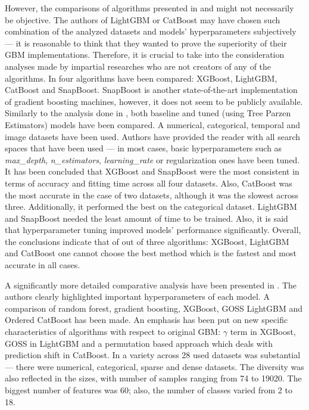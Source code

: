 \documentclass[magisterska, english]{pwr_wmat_praca_dyplomowa}
\theoremstyle{plain}
\numberwithin{theorem}{chapter}
\theoremstyle{definition}
\numberwithin{theorem}{chapter}
\begin{document}
However, the comparisons of algorithms presented in \cite{lightgbm} and \cite{catboost} might not necessarily be objective. The authors of LightGBM or CatBoost may have chosen such combination of the analyzed datasets and models' hyperparameters subjectively --- it is reasonable to think that they wanted to prove the superiority of their GBM implementations. Therefore, it is crucial to take into the consideration analyses made by impartial researches who are not creators of any of the algorithms. In \cite{competitive_analysis} four algorithms have been compared: XGBoost, LightGBM, CatBoost and SnapBoost. SnapBoost is another state-of-the-art implementation of gradient boosting machines, however, it does not seem to be publicly available. Similarly to the analysis done in \cite{catboost}, both baseline and tuned (using Tree Parzen Estimators) models have been compared. A numerical, categorical, temporal and image datasets have been used. Authors have provided the reader with all search spaces that have been used --- in most cases, basic hyperparameters such as \emph{max\_depth}, \emph{n\_estimators}, \emph{learning\_rate} or regularization ones have been tuned. It has been concluded that XGBoost and SnapBoost were the most consistent in terms of accuracy and fitting time across all four datasets. Also, CatBoost was the most accurate in the case of two datasets, although it was the slowest across three. Additionally, it performed the best on the categorical dataset. LightGBM and SnapBoost needed the least amount of time to be trained. Also, it is said that hyperparameter tuning improved models' performance significantly. Overall, the conclusions indicate that of out of three algorithms: XGBoost, LightGBM and CatBoost one cannot choose the best method which is the fastest and most accurate in all cases.

A significantly more detailed comparative analysis have been presented in \cite{comparative_analysis}. The authors clearly highlighted important hyperparameters of each model. A comparison of random forest, gradient boosting, XGBoost, GOSS LightGBM and Ordered CatBoost has been made. An emphasis has been put on new specific characteristics of algorithms with respect to original GBM: $\gamma$ term in XGBoost, GOSS in LightGBM and a permutation based approach which deals with prediction shift in CatBoost. In \cite{comparative_analysis} a variety across 28 used datasets was substantial --- there were numerical, categorical, sparse and dense datasets. The diversity was also reflected in the sizes, with number of samples ranging from 74 to 19020. The biggest number of features was 60; also, the number of classes varied from 2 to 18.
\end{document}
